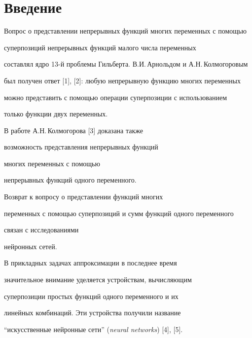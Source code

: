 \maketitle


\label{begin}





\section{Введение}





Вопрос о представлении непрерывных функций многих переменных с помощью


суперпозиций непрерывных функций малого числа переменных


составлял ядро 13-й проблемы Гильберта. В.И.\,Арнольдом и А.Н.\,Колмогоровым


был получен ответ [1], [2]: любую непрерывную функцию многих переменных


можно представить с помощью операции суперпозиции с использованием


только функции двух переменных.





В работе А.Н.\,Колмогорова [3] доказана также


возможность представления непрерывных функций


многих переменных с помощью


непрерывных функций одного переменного.





Возврат к вопросу о представлении функций многих


переменных с помощью суперпозиций и сумм функций одного переменного


связан с исследованиями


нейронных сетей.


В прикладных задачах аппроксимации в последнее время


значительное внимание уделяется устройствам, вычисляющим


суперпозиции простых функций одного переменного  и  их


линейных комбинаций. Эти устройства  получили  название


``искусственные нейронные сети'' ({\it neural networks}) [4], [5].


